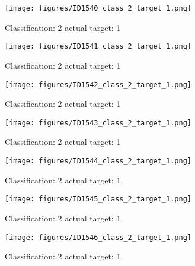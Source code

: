 \begin{figure}[h!]
\begin{center}
\texttt{[image: figures/ID1540\_class\_2\_target\_1.png]}
\end{center}
\caption{ Classification: 2 actual target: 1}
\label{fig:ID1540_class_2_target_1}
\end{figure}
\begin{figure}[h!]
\begin{center}
\texttt{[image: figures/ID1541\_class\_2\_target\_1.png]}
\end{center}
\caption{ Classification: 2 actual target: 1}
\label{fig:ID1541_class_2_target_1}
\end{figure}
\begin{figure}[h!]
\begin{center}
\texttt{[image: figures/ID1542\_class\_2\_target\_1.png]}
\end{center}
\caption{ Classification: 2 actual target: 1}
\label{fig:ID1542_class_2_target_1}
\end{figure}
\begin{figure}[h!]
\begin{center}
\texttt{[image: figures/ID1543\_class\_2\_target\_1.png]}
\end{center}
\caption{ Classification: 2 actual target: 1}
\label{fig:ID1543_class_2_target_1}
\end{figure}
\begin{figure}[h!]
\begin{center}
\texttt{[image: figures/ID1544\_class\_2\_target\_1.png]}
\end{center}
\caption{ Classification: 2 actual target: 1}
\label{fig:ID1544_class_2_target_1}
\end{figure}
\begin{figure}[h!]
\begin{center}
\texttt{[image: figures/ID1545\_class\_2\_target\_1.png]}
\end{center}
\caption{ Classification: 2 actual target: 1}
\label{fig:ID1545_class_2_target_1}
\end{figure}
\begin{figure}[h!]
\begin{center}
\texttt{[image: figures/ID1546\_class\_2\_target\_1.png]}
\end{center}
\caption{ Classification: 2 actual target: 1}
\label{fig:ID1546_class_2_target_1}
\end{figure}
